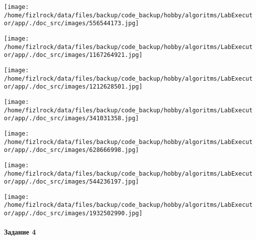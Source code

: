 \documentclass[a4paper, 12pt]{article}
\begin{document}
\texttt{[image: /home/fizlrock/data/files/backup/code\_backup/hobby/algoritms/LabExecutor/app/./doc\_src/images/556544173.jpg]}

\texttt{[image: /home/fizlrock/data/files/backup/code\_backup/hobby/algoritms/LabExecutor/app/./doc\_src/images/1167264921.jpg]}

\texttt{[image: /home/fizlrock/data/files/backup/code\_backup/hobby/algoritms/LabExecutor/app/./doc\_src/images/1212628501.jpg]}

\texttt{[image: /home/fizlrock/data/files/backup/code\_backup/hobby/algoritms/LabExecutor/app/./doc\_src/images/341031358.jpg]}

\texttt{[image: /home/fizlrock/data/files/backup/code\_backup/hobby/algoritms/LabExecutor/app/./doc\_src/images/628666998.jpg]}

\texttt{[image: /home/fizlrock/data/files/backup/code\_backup/hobby/algoritms/LabExecutor/app/./doc\_src/images/544236197.jpg]}

\texttt{[image: /home/fizlrock/data/files/backup/code\_backup/hobby/algoritms/LabExecutor/app/./doc\_src/images/1932502990.jpg]}
\pagebreak
\paragraph{Задание 4}
\end{document}
